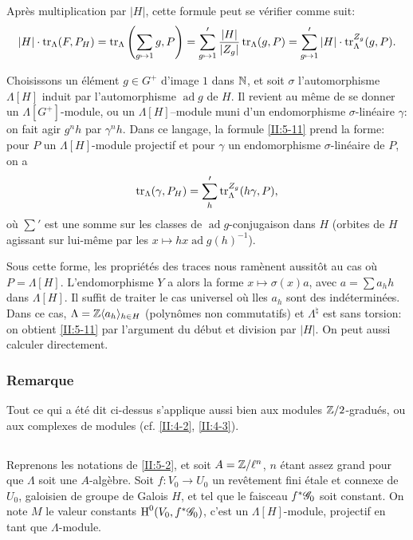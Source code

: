 Apr\`es multiplication par $|H|$, cette formule peut se v\'erifier comme suit: 
\[
  |H|\cdot \operatorname{tr}_\Lambda(F,P_H) 
    = \operatorname{tr}_\Lambda\left(\sum_{g\mapsto 1} g,P\right) 
    = \sum_{g\mapsto 1}' \frac{|H|}{|Z_g|}\operatorname{tr}_\Lambda(g,P) 
    = \sum_{g\mapsto 1}' |H|\cdot \operatorname{tr}_\Lambda^{Z_g}(g,P) \text{.}
\]

Choisissons un \'el\'ement $g\in G^+$ d'image $1$ dans $\mathbb{N}$, et soit 
$\sigma$ l'automorphisme $\Lambda[H]$ induit par l'automorphisme 
$\operatorname{ad} g$ de $H$. Il revient au m\^eme de se donner un 
$\Lambda[G^+]$-module, ou un $\Lambda[H]$--module muni d'un endomorphisme 
$\sigma$-lin\'eaire $\gamma$: on fait agir $g^n h$ par $\gamma^n h$. Dans ce 
langage, la formule \ref{II:5-11} prend la forme: pour $P$ un 
$\Lambda[H]$-module projectif et pour $\gamma$ un endomorphisme 
$\sigma$-lin\'eaire de $P$, on a 
\[
  \operatorname{tr}_\Lambda(\gamma,P_H) = \sum_h' \operatorname{tr}_\Lambda^{Z_g}(h\gamma,P)\text{,}
\]
o\`u $\sum'$ est une somme sur les classes de $\operatorname{ad}g$-conjugaison 
dans $H$ (orbites de $H$ agissant sur lui-m\^eme par les 
$x\mapsto h x \operatorname{ad} g(h)^{-1}$). 

Sous cette forme, les propri\'et\'es des traces nous ram\`enent aussit\^ot au 
cas o\`u $P=\Lambda[H]$. L'endomorphisme $Y$ a alors la forme 
$x\mapsto \sigma(x) a$, avec $a=\sum a_h h$ dans $\Lambda[H]$. Il suffit de 
traiter le cas universel o\`u lles $a_h$ sont des ind\'etermin\'ees. Dans ce 
cas, $\Lambda=\mathbb{Z}\langle a_h\rangle_{h\in H}$ (polyn\^omes non commutatifs) et 
$\Lambda^\natural$ est sans torsion: on obtient \ref{II:5-11} par l'argument 
du d\'ebut et division par $|H|$. On peut aussi calculer directement. 





\subsubsection{Remarque}\label{II:5-11-1}

Tout ce qui a \'et\'e dit ci-dessus s'applique aussi bien aux modules 
$\mathbb{Z}/2$-gradu\'es, ou aux complexes de modules (cf. \ref{II:4-2}, \ref{II:4-3}). 





\subsection{}\label{II:5-12}

Reprenons les notations de \ref{II:5-2}, et soit $A=\mathbb{Z}/\ell^n$, $n$ \'etant 
assez grand pour que $\Lambda$ soit une $A$-alg\`ebre. Soit $f:V_0\to U_0$ un 
rev\^etement fini \'etale et connexe de $U_0$, galoisien de groupe de Galois 
$H$, et tel que le faisceau $f^*\mathscr{G}_0$ soit constant. On note $M$ le valeur 
constants $\operatorname{H}^0(V_0,f^*\mathscr{G}_0)$, c'est un $\Lambda[H]$-module, projectif en 
tant que $\Lambda$-module. 

